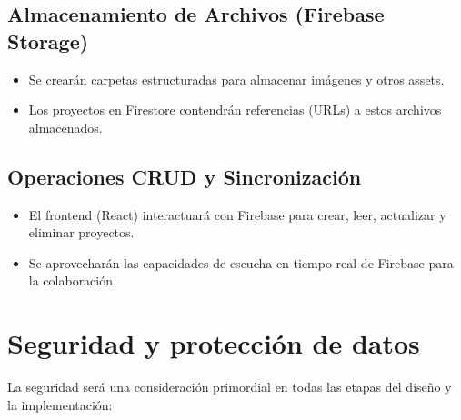 \documentclass[12pt,a4paper]{report}
\begin{document}
\subsection{Almacenamiento de Archivos (Firebase Storage)}

\begin{itemize}
\item Se crearán carpetas estructuradas para almacenar imágenes y otros assets.
\item Los proyectos en Firestore contendrán referencias (URLs) a estos archivos almacenados.
\end{itemize}

\subsection{Operaciones CRUD y Sincronización}

\begin{itemize}
\item El frontend (React) interactuará con Firebase para crear, leer, actualizar y eliminar proyectos.
\item Se aprovecharán las capacidades de escucha en tiempo real de Firebase para la colaboración.
\end{itemize}

\section{Seguridad y protección de datos}

La seguridad será una consideración primordial en todas las etapas del diseño y la implementación:
\end{document}
